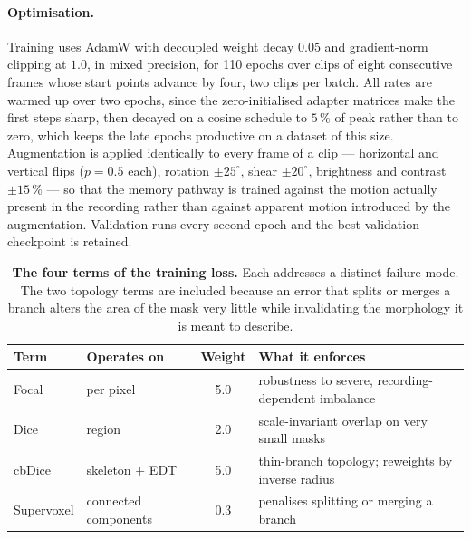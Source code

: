 \paragraph{Optimisation.}
Training uses AdamW \cite{loshchilov2019adamw} with decoupled weight decay
$0.05$ and gradient-norm clipping at $1.0$, in mixed precision, for 110
epochs over clips of eight consecutive frames whose start points advance by
four, two clips per batch. All rates are warmed up over two epochs, since the
zero-initialised adapter matrices make the first steps sharp, then decayed
on a cosine schedule to $5\,\%$ of peak rather than to zero, which keeps the
late epochs productive on a dataset of this size. Augmentation is applied
identically to every frame of a clip --- horizontal and vertical flips
($p = 0.5$ each), rotation $\pm25^{\circ}$, shear $\pm20^{\circ}$,
brightness and contrast $\pm15\,\%$ --- so that the memory pathway is
trained against the motion actually present in the recording rather than
against apparent motion introduced by the augmentation. Validation runs
every second epoch and the best validation checkpoint is retained.

\begin{table}[!ht]
\centering
\caption{\textbf{The four terms of the training loss.} Each addresses a
distinct failure mode. The two topology terms are included because an error
that splits or merges a branch alters the area of the mask very little while
invalidating the morphology it is meant to describe.}
\label{tab:loss}
\small
\begin{tabular}{llcl}
\toprule
Term & Operates on & Weight & What it enforces \\
\midrule
Focal \cite{lin2017focal}        & per pixel            & 5.0 & robustness to severe, recording-dependent imbalance \\
Dice \cite{milletari2016vnet}    & region               & 2.0 & scale-invariant overlap on very small masks \\
cbDice \cite{shi2024cbdice}      & skeleton $+$ EDT     & 5.0 & thin-branch topology; reweights by inverse radius \\
Supervoxel \cite{grim2025supervoxel} & connected components & 0.3 & penalises splitting or merging a branch \\
\bottomrule
\end{tabular}
\end{table}
